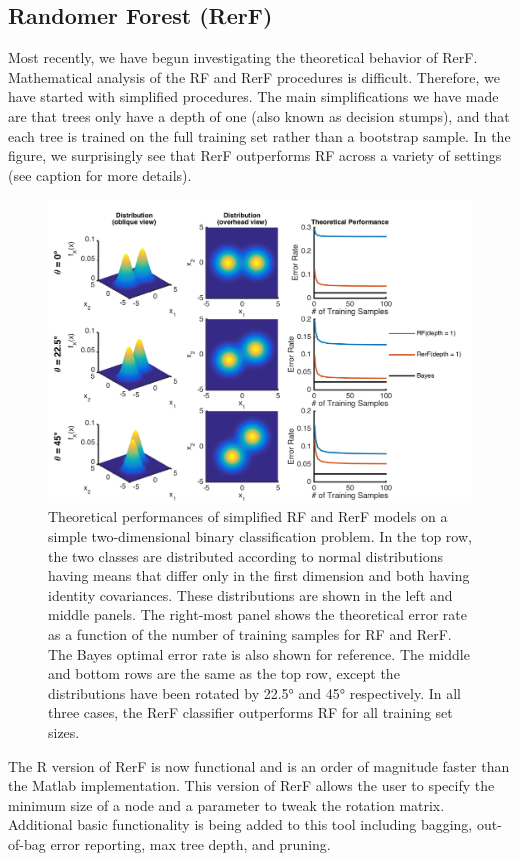 \documentclass[simplex.tex]{subfiles}
\begin{document}
\subsection[Randomer Forest]{Randomer Forest (RerF)}

Most recently, we have begun investigating the theoretical behavior of RerF. Mathematical analysis of the RF and RerF procedures is difficult. Therefore, we have started with simplified procedures. The main simplifications we have made are that trees only have a depth of one (also known as decision stumps), and that each tree is trained on the full training set rather than a bootstrap sample. In the figure, we surprisingly see that RerF outperforms RF across a variety of settings (see caption for more details).

\begin{figure}[h!]
\begin{cframed}
\centering
\includegraphics[height=0.4\textheight]{../../figs/RerF.png}
\caption{
Theoretical performances of simplified RF and RerF models on a simple two-dimensional binary classification problem. In the top row, the two classes are distributed according to normal distributions having means that differ only in the first dimension and both having identity covariances. These distributions are shown in the left and middle panels. The right-most panel shows the theoretical error  rate as a function of the number of training samples for RF and RerF. The Bayes optimal error rate is also shown for reference. The middle and bottom rows are the same as the top row, except the distributions have been rotated by 22.5° and 45° respectively. In all three cases, the RerF classifier outperforms RF for all training set sizes.
}
\label{fig:RerF}
\end{cframed}
\end{figure}

The R version of RerF is now functional and is an order of magnitude faster than the Matlab implementation.  This version of RerF allows the user to specify the minimum size of a node and a parameter to tweak the rotation matrix.  Additional basic functionality is being added to this tool including bagging, out-of-bag error reporting, max tree depth, and pruning.   
\end{document}
